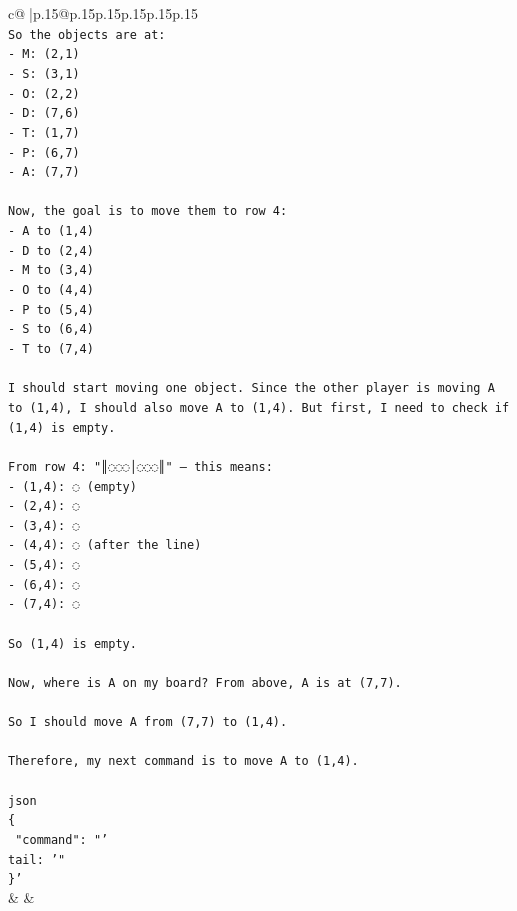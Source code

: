 \documentclass{article}
\begin{document}
{\begin{supertabular}{c@{$\;$}|p{.15\linewidth}@{}p{.15\linewidth}p{.15\linewidth}p{.15\linewidth}p{.15\linewidth}p{.15\linewidth}}
{{{\\ 
\texttt{So the objects are at:} \\
\texttt{{-} M: (2,1)} \\
\texttt{{-} S: (3,1)} \\
\texttt{{-} O: (2,2)} \\
\texttt{{-} D: (7,6)} \\
\texttt{{-} T: (1,7)} \\
\texttt{{-} P: (6,7)} \\
\texttt{{-} A: (7,7)} \\
\\ 
\texttt{Now, the goal is to move them to row 4:} \\
\texttt{{-} A to (1,4)} \\
\texttt{{-} D to (2,4)} \\
\texttt{{-} M to (3,4)} \\
\texttt{{-} O to (4,4)} \\
\texttt{{-} P to (5,4)} \\
\texttt{{-} S to (6,4)} \\
\texttt{{-} T to (7,4)} \\
\\ 
\texttt{I should start moving one object. Since the other player is moving A to (1,4), I should also move A to (1,4). But first, I need to check if (1,4) is empty.} \\
\\ 
\texttt{From row 4: "║◌◌◌│◌◌◌║" — this means:} \\
\texttt{{-} (1,4): ◌ (empty)} \\
\texttt{{-} (2,4): ◌} \\
\texttt{{-} (3,4): ◌} \\
\texttt{{-} (4,4): ◌ (after the line)} \\
\texttt{{-} (5,4): ◌} \\
\texttt{{-} (6,4): ◌} \\
\texttt{{-} (7,4): ◌} \\
\\ 
\texttt{So (1,4) is empty.} \\
\\ 
\texttt{Now, where is A on my board? From above, A is at (7,7).} \\
\\ 
\texttt{So I should move A from (7,7) to (1,4).} \\
\\ 
\texttt{Therefore, my next command is to move A to (1,4).} \\
\\ 
\texttt{json} \\
\texttt{\{} \\
\texttt{  "command": "'} \\
\texttt{tail: '"} \\
\texttt{\}'} \\
            }
        }
    }
    & & \\ \\


\end{supertabular}}
\end{document}
